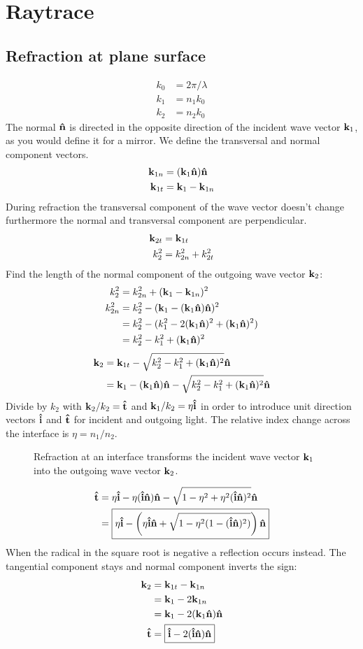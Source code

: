 \chapter{Raytrace}
\renewcommand{\i}{\nvect i}
\section{Refraction at plane surface}
\begin{align}
  k_0&=2\pi/\lambda\\
  k_1&=n_1 k_0\\
  k_2&=n_2 k_0
\end{align}
The normal $\mathbf{\hat{n}}$ is directed in the opposite direction of the incident
wave vector $\mathbf{k}_1$, as you would define it for a mirror. We define the
transversal and normal component vectors.
\begin{align}
  \mathbf{k}_{1n}&=(\mathbf{k}_1\mathbf{\hat{n}})\mathbf{\hat{n}}\\ 
  \mathbf{k}_{1t}&=\mathbf{k}_1 - \mathbf{k}_{1n}
\end{align}
During refraction the transversal component of the wave vector doesn't
change furthermore the normal and transversal component are
perpendicular.
\begin{align}
  \mathbf{k}_{2t}&=\mathbf{k}_{1t}\\
  k_2^2&=k_{2n}^2 + k_{2t}^2
\end{align}
Find the length of the normal component of the outgoing wave vector $\mathbf{k}_2$:
\begin{align}
  k_2^2&=k_{2n}^2 + (\mathbf{k}_1 - \mathbf{k}_{1n})^2\\
  k_{2n}^2&=k_2^2-(\mathbf{k}_1-(\mathbf{k}_1\mathbf{\hat{n}})\mathbf{\hat{n}})^2\\
  &= k_2^2-(k_1^2-2(\mathbf{k}_1\mathbf{\hat{n}})^2+(\mathbf{k}_1\mathbf{\hat{n}})^2)\\
  &= k_2^2-k_1^2+(\mathbf{k}_1\mathbf{\hat{n}})^2
\end{align}
\begin{align}
  \mathbf{k}_2&=\mathbf{k}_{1t}-\sqrt{k_2^2-k_1^2+(\mathbf{k}_1\mathbf{\hat{n}})^2}\mathbf{\hat{n}}\\
  &=\mathbf{k}_1-(\mathbf{k}_1\mathbf{\hat{n}})\mathbf{\hat{n}}-\sqrt{k_2^2-k_1^2+(\mathbf{k}_1\mathbf{\hat{n}})^2}\mathbf{\hat{n}}
\end{align}
Divide by $k_2$ with $\mathbf{k}_2/k_2=\mathbf{\hat{t}}$ and $\k_1/k_2=\eta\i$ in order to
introduce unit direction vectors $\i$ and $\mathbf{\hat{t}}$ for incident and
outgoing light. The relative index change across the interface is
$\eta=n_1/n_2$.
\begin{figure}
  \centering
  
  \caption{Refraction at an interface transforms the incident wave
    vector $\mathbf{k}_1$ into the outgoing wave vector $\mathbf{k}_2$.}
\end{figure}
\begin{align}
  \t&=\eta\i-\eta(\i\n)\n-\sqrt{1-\eta^2+\eta^2(\i\n)^2}\n\\
  &=\boxed{\eta\i-\left(\eta\i\n+\sqrt{1-\eta^2(1-(\i\n)^2)}\right)\n}
\end{align}
 When the radical in the square root is negative a reflection occurs
 instead. The tangential component stays and normal component inverts
 the sign:
 \begin{align}
   \k_2&=\k_{1t}-\k_{1n}\\
   &=\k_1 - 2\k_{1n}\\
   &=\k_1-2(\k_1\n)\n\\
   \t&=\boxed{\i-2(\i\n)\n}
 \end{align}
